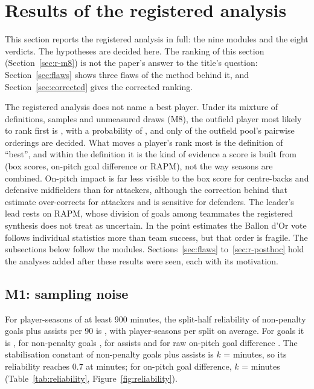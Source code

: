 \documentclass[11pt,a4paper]{article}
\begin{document}
\section{Results of the registered analysis}
\label{sec:results}

This section reports the registered analysis in full: the nine modules and the
eight verdicts. The hypotheses are decided here. The ranking of this section
(Section~\ref{sec:r-m8}) is not the paper's answer to the title's question:
Section~\ref{sec:flaws} shows three flaws of the method behind it, and
Section~\ref{sec:corrected} gives the corrected ranking.

The registered analysis does not name a best player. Under its mixture of
definitions, samples and unmeasured draws (M8), the outfield player most
likely to rank first is \TopPlayerName{}, with a probability of
\TopPlayerPFirst{}, and only \SharePairsDecided{} of the outfield pool's
pairwise orderings are decided. What moves a player's rank most is the
definition of ``best'', and within the definition it is the kind of evidence a
score is built from (box scores, on-pitch goal difference or RAPM), not the
way seasons are combined. On-pitch impact is far less visible to the box score
for centre-backs and defensive midfielders than for attackers, although the
correction behind that estimate over-corrects for attackers and is sensitive
for defenders. The leader's lead rests on RAPM, whose division of goals among
teammates the registered synthesis does not treat as uncertain. In the point
estimates the Ballon d'Or vote follows individual statistics more than team
success, but that order is fragile. The subsections below follow the modules.
Sections~\ref{sec:flaws} to~\ref{sec:r-posthoc} hold the analyses added after
these results were seen, each with its motivation.

\subsection{M1: sampling noise}
\label{sec:r-m1}

For player-seasons of at least 900 minutes, the split-half reliability of
non-penalty goals plus assists per 90 is \RelNpga{}, with \NReliabilityUnits{}
player-seasons per split on average. For goals it is \RelGoals{}, for
non-penalty goals \RelNpGoals{}, for assists \RelAssists{} and for raw on-pitch
goal difference \RelOnPitchGd{}. The stabilisation constant of non-penalty goals
plus assists is $k$ = \StabKNpga{} minutes, so its reliability reaches 0.7 at
\StabSevenNpga{} minutes; for on-pitch goal difference, $k$ = \StabKOnPitchGd{}
minutes (Table~\ref{tab:reliability}, Figure~\ref{fig:reliability}).
\end{document}
